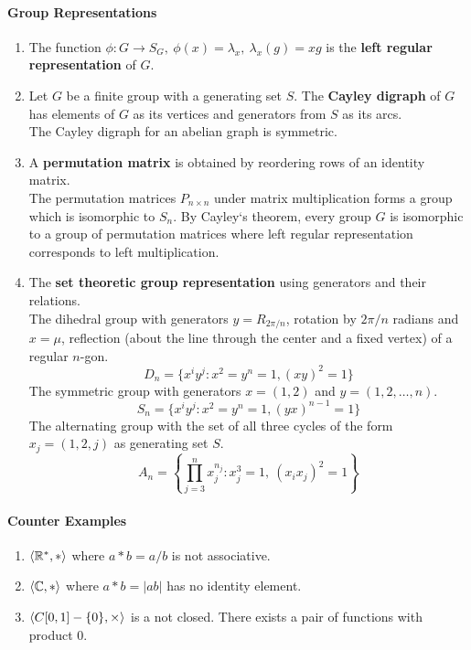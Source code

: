 \paragraph{Group Representations}
\begin{enumerate}
	\item The function $\phi : G \to S_G,\ \phi(x)=\lambda_x,\ \lambda_x(g) = xg$ is the \textbf{left regular representation} of $G$.
	\item Let $G$ be a finite group with a generating set $S$. The \textbf{Cayley digraph} of $G$ has elements of $G$ as its vertices and generators from $S$ as its arcs.\\
	The Cayley digraph for an abelian graph is symmetric.
	\item A \textbf{permutation matrix} is obtained by reordering rows of an identity matrix.\\
	The permutation matrices $P_{n \times n}$ under matrix multiplication forms a group which is isomorphic to $S_n$. By Cayley`s theorem, every group $G$ is isomorphic to a group of permutation matrices where left regular representation corresponds to left multiplication.
	\item The \textbf{set theoretic group representation} using generators and their relations.\\
	The dihedral group with generators $y=R_{2\pi/n}$, rotation by $2\pi/n$ radians and $x=\mu$, reflection (about the line through the center and a fixed vertex) of a regular $n$-gon.
	$$D_n = \{ x^iy^j : x^2=y^n=1, (xy)^2=1 \}$$
	The symmetric group with generators $x=(1,2)$ and $y=(1,2,\dots,n)$. 
	$$S_n = \{ x^iy^j : x^2=y^n=1,(yx)^{n-1}=1 \}$$
	The alternating group with the set of all three cycles of the form $x_j = (1,2,j)$ as generating set $S$.
	$$A_n = \left\{ \prod_{j=3}^n x_j^{n_j} : x_j^3=1,\ (x_ix_j)^2=1\right\}$$
\end{enumerate}
\paragraph{Counter Examples}
\begin{enumerate}
	\item $\left\langle \mathbb{R}^\ast,\ast \right\rangle$ where $a \ast b = a/b$ is not associative.
	\item $\left\langle \mathbb{C},\ast \right\rangle$ where $a \ast b = |ab|$ has no identity element.
	\item $\left\langle C[0,1]-\{0\},\times \right\rangle$ is a not closed. There exists a pair of functions with product $0$.
\end{enumerate}

